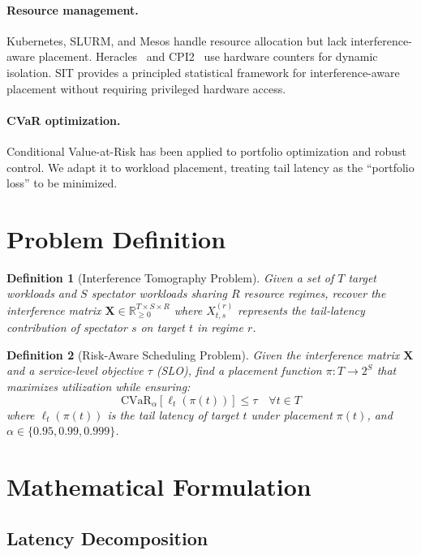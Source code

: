 \documentclass[11pt,twocolumn]{article}
\newtheorem{definition}{Definition}
\begin{document}
\paragraph{Resource management.} Kubernetes, SLURM, and Mesos handle
resource allocation but lack interference-aware placement.
Heracles~\cite{lo2015heracles} and CPI2~\cite{zhang2013cpi2} use hardware
counters for dynamic isolation. SIT provides a principled statistical
framework for interference-aware placement without requiring privileged
hardware access.

\paragraph{CVaR optimization.} Conditional Value-at-Risk has been applied
to portfolio optimization and robust control. We adapt it to workload
placement, treating tail latency as the ``portfolio loss'' to be minimized.

\section{Problem Definition}

\begin{definition}[Interference Tomography Problem]
Given a set of $T$ target workloads and $S$ spectator workloads sharing
$R$ resource regimes, recover the interference matrix
$\mathbf{X} \in \mathbb{R}_{\geq 0}^{T \times S \times R}$ where
$X_{t,s}^{(r)}$ represents the tail-latency contribution of spectator
$s$ on target $t$ in regime $r$.
\end{definition}

\begin{definition}[Risk-Aware Scheduling Problem]
Given the interference matrix $\mathbf{X}$ and a service-level objective
$\tau$ (SLO), find a placement function $\pi: T \to 2^S$ that maximizes
utilization while ensuring:
\[
\text{CVaR}_\alpha\left[\ell_t(\pi(t))\right] \leq \tau \quad \forall t \in T
\]
where $\ell_t(\pi(t))$ is the tail latency of target $t$ under placement
$\pi(t)$, and $\alpha \in \{0.95, 0.99, 0.999\}$.
\end{definition}

\section{Mathematical Formulation}

\subsection{Latency Decomposition}
\end{document}
